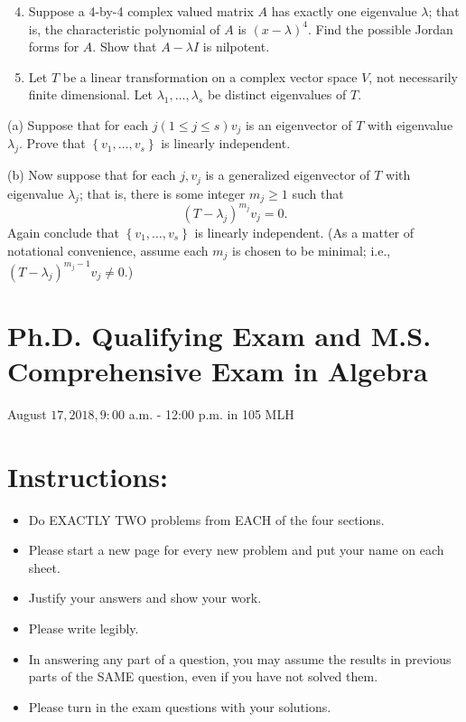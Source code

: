 \documentclass[10pt]{article}
\begin{document}
\begin{enumerate}
  \setcounter{enumi}{3}
  \item Suppose a 4-by-4 complex valued matrix $A$ has exactly one eigenvalue $\lambda$; that is, the characteristic polynomial of $A$ is $(x-\lambda)^{4}$. Find the possible Jordan forms for $A$. Show that $A-\lambda I$ is nilpotent.

  \item Let $T$ be a linear transformation on a complex vector space $V$, not necessarily finite dimensional. Let $\lambda_{1}, \ldots, \lambda_{s}$ be distinct eigenvalues of $T$.

\end{enumerate}
(a) Suppose that for each $j(1 \leq j \leq s) v_{j}$ is an eigenvector of $T$ with eigenvalue $\lambda_{j}$. Prove that $\left\{v_{1}, \ldots, v_{s}\right\}$ is linearly independent.

(b) Now suppose that for each $j, v_{j}$ is a generalized eigenvector of $T$ with eigenvalue $\lambda_{j}$; that is, there is some integer $m_{j} \geq 1$ such that
$$
\left(T-\lambda_{j}\right)^{m_{j}} v_{j}=0 .
$$
Again conclude that $\left\{v_{1}, \ldots, v_{s}\right\}$ is linearly independent. (As a matter of notational convenience, assume each $m_{j}$ is chosen to be minimal; i.e., $\left(T-\lambda_{j}\right)^{m_{j}-1} v_{j} \neq 0$.)

\section*{Ph.D. Qualifying Exam and M.S. Comprehensive Exam in Algebra }

August $17,2018,9: 00$ a.m. - 12:00 p.m. in 105 MLH

\section*{Instructions: }
\begin{itemize}
  \item Do EXACTLY TWO problems from EACH of the four sections.

  \item Please start a new page for every new problem and put your name on each sheet.

  \item Justify your answers and show your work.

  \item Please write legibly.

  \item In answering any part of a question, you may assume the results in previous parts of the SAME question, even if you have not solved them.

  \item Please turn in the exam questions with your solutions.

\end{itemize}
\end{document}
